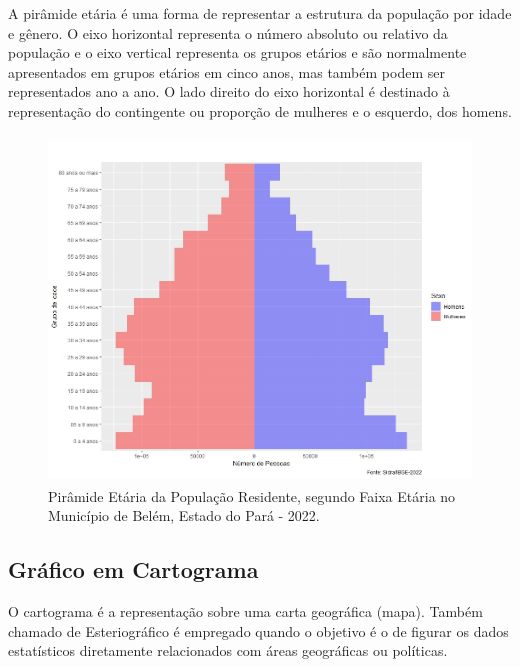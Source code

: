 A pirâmide etária é uma forma de representar a estrutura da
população por idade e gênero. O eixo horizontal representa o
número absoluto ou relativo da população e o eixo vertical
representa os grupos etários e são normalmente apresentados em grupos etários em cinco anos, mas também podem ser representados ano a ano. O lado direito do eixo horizontal é destinado à representação do contingente ou proporção de mulheres e o esquerdo, dos homens.



\begin{figure}[H]
    \centering
\includegraphics[scale=0.25,height=260pt,width=12cm]{figures/piramide1.jpeg}
    \caption{Pirâmide Etária da População Residente, segundo Faixa Etária no Município de Belém, Estado do Pará - 2022.}
    \label{fig:my_label30}
\end{figure}

















\newpage
\subsection{Gráfico em Cartograma}

O cartograma é a representação sobre uma carta geográfica (mapa).
Também chamado de Esteriográfico é empregado quando o objetivo é o de
figurar os dados estatísticos diretamente relacionados com áreas
geográficas ou políticas.



